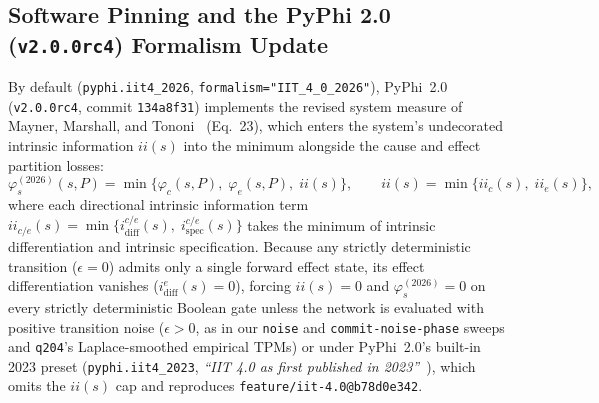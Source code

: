 \documentclass[11pt,a4paper]{article}
\begin{document}
\subsection{Software Pinning and the PyPhi 2.0 (\texttt{v2.0.0rc4}) Formalism Update}
\label{subsec:pyphi2_update}

By default (\texttt{pyphi.iit4\_2026}, \texttt{formalism="IIT\_4\_0\_2026"}), PyPhi~2.0 (\texttt{v2.0.0rc4}, commit \texttt{134a8f31}) implements the revised system measure of Mayner, Marshall, and Tononi~\cite{mayner2026intrinsic} (Eq.~23), which enters the system's undecorated intrinsic information $\mathit{ii}(s)$ into the minimum alongside the cause and effect partition losses:
\begin{equation}
  \varphi_s^{(2026)}(s, P) = \min\!\bigl\{\varphi_c(s, P),\; \varphi_e(s, P),\; \mathit{ii}(s)\bigr\},
  \qquad
  \mathit{ii}(s) = \min\!\bigl\{\mathit{ii}_c(s),\; \mathit{ii}_e(s)\bigr\},
  \label{eq:phi_s_2026}
\end{equation}
where each directional intrinsic information term $\mathit{ii}_{c/e}(s) = \min\{i^{c/e}_{\mathrm{diff}}(s),\; i^{c/e}_{\mathrm{spec}}(s)\}$ takes the minimum of intrinsic differentiation and intrinsic specification. Because any strictly deterministic transition ($\epsilon = 0$) admits only a single forward effect state, its effect differentiation vanishes ($i^e_{\mathrm{diff}}(s) = 0$), forcing $\mathit{ii}(s) = 0$ and $\varphi_s^{(2026)} = 0$ on every strictly deterministic Boolean gate unless the network is evaluated with positive transition noise ($\epsilon > 0$, as in our \texttt{noise} and \texttt{commit-noise-phase} sweeps and \texttt{q204}'s Laplace-smoothed empirical TPMs) or under PyPhi~2.0's built-in 2023 preset (\texttt{pyphi.iit4\_2023}, \emph{``IIT 4.0 as first published in 2023''}~\cite{albantakis2023iit4}), which omits the $\mathit{ii}(s)$ cap and reproduces \texttt{feature/iit-4.0@b78d0e342}.
\end{document}
